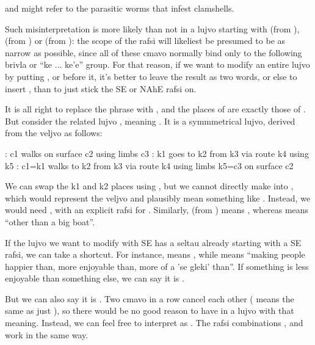 {\noindent}and might refer to the parasitic worms that infest clamshells. 

Such misinterpretation is more likely than not in a lujvo
    starting with  (from ),  (from )
    or  (from ): the scope of the rafsi will
    likeliest be presumed to be as narrow as possible, since all of
    these cmavo normally bind only to the following brivla or ``ke
    ... ke'e'' group. For that reason, if we want to modify an
    entire lujvo by putting ,  or  before it,
    it's better to leave the result as two words, or else to insert
    , than to just stick the SE or NAhE rafsi on.

It is all right to replace the phrase  with
    , and the places of  are exactly those of
    . But consider the related lujvo ,
    meaning . It is a symmmetrical lujvo,
    derived from the veljvo  as follows:
\begin{example}
: c1 walks on surface c2 using limbs c3\n
{}: k1 goes to k2 from k3 via route k4 using k5\n
{}: c1=k1 walks to k2 from k3 via route k4\n
\T	using limbs k5=c3 on surface c2
\end{example}

We can swap the k1 and k2 places using , but we
    cannot directly make  into , which
    would represent the veljvo  and plausibly
    mean something like . Instead, we
    would need , with an explicit rafsi for .
    Similarly,  (from ) means
    , whereas  means ``other than a
    big boat''.

If the lujvo we want to modify with SE has a seltau already
    starting with a SE rafsi, we can take a shortcut. For instance,
     means , while  means
    ``making people happier than, more enjoyable than, more of a
    'se gleki' than''. If something is less enjoyable than
    something else, we can say it is .

But we can also say it is . Two  cmavo
    in a row cancel each other ( means the same as
    just ), so there would be no good reason to have
     in a lujvo with that meaning. Instead, we can feel
    free to interpret  as . The rafsi
    combinations ,  and  work in
    the same way.

